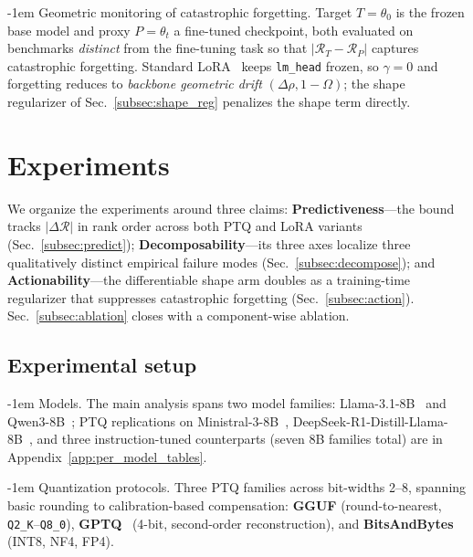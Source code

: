 \documentclass{article}
\makeatletter
\newlength{\paraSpace}
\renewcommand{\paragraph}{\@startsection{paragraph}{4}{\z@}%
  {\paraSpace}{-1em}%
  {\normalfont\normalsize\bfseries}}
\makeatother
\begin{document}
\paragraph{Geometric monitoring of catastrophic forgetting.}
\label{subsec:forgetting}
Target $T{=}\theta_0$ is the frozen base model and proxy $P{=}\theta_t$ a fine-tuned checkpoint, both evaluated on benchmarks \emph{distinct} from the fine-tuning task so that $|\mathcal{R}_T - \mathcal{R}_P|$ captures catastrophic forgetting. Standard LoRA~\cite{hu2022lora} keeps \texttt{lm\_head} frozen, so $\gamma{=}0$ and forgetting reduces to \emph{backbone geometric drift} $(\Delta\rho, 1{-}\Omega)$; the shape regularizer of Sec.~\ref{subsec:shape_reg} penalizes the shape term directly.


\section{Experiments}
\label{sec:experiments}

We organize the experiments around three claims: \textbf{Predictiveness}---the bound tracks $|\Delta\mathcal{R}|$ in rank order across both PTQ and LoRA variants (Sec.~\ref{subsec:predict}); \textbf{Decomposability}---its three axes localize three qualitatively distinct empirical failure modes (Sec.~\ref{subsec:decompose}); and \textbf{Actionability}---the differentiable shape arm doubles as a training-time regularizer that suppresses catastrophic forgetting (Sec.~\ref{subsec:action}). Sec.~\ref{subsec:ablation} closes with a component-wise ablation.

\subsection{Experimental setup}
\label{subsec:exp_setup}

\paragraph{Models.}
The main analysis spans two model families: Llama-3.1-8B~\cite{grattafiori2024llama} and Qwen3-8B~\cite{qwen2025qwen3}; PTQ replications on Ministral-3-8B~\cite{liu2026ministral3}, DeepSeek-R1-Distill-Llama-8B~\cite{deepseekai2025r1}, and three instruction-tuned counterparts (seven 8B families total) are in Appendix~\ref{app:per_model_tables}.

\paragraph{Quantization protocols.}
Three PTQ families across bit-widths 2--8, spanning basic rounding to calibration-based compensation: \textbf{GGUF} (round-to-nearest, \texttt{Q2\_K}--\texttt{Q8\_0}), \textbf{GPTQ}~\cite{frantar2022gptq} (4-bit, second-order reconstruction), and \textbf{BitsAndBytes}~\cite{dettmers2022gpt3} (INT8, NF4, FP4).
\end{document}
